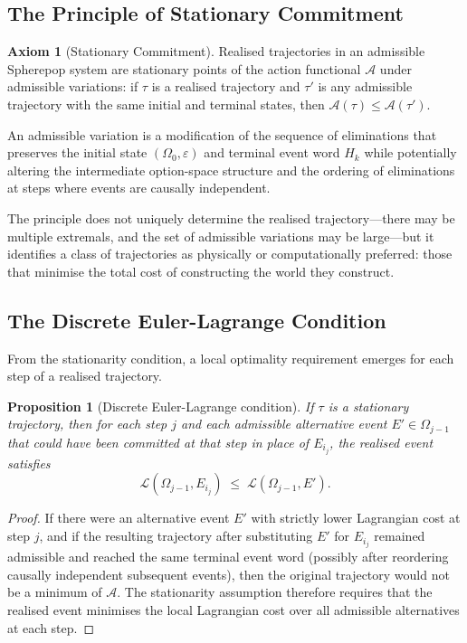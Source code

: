 \documentclass[12pt]{article}
\theoremstyle{plain}
\newtheorem{proposition}[theorem]{Proposition}
\theoremstyle{definition}
\newtheorem{axiom}[theorem]{Axiom}
\theoremstyle{remark}
\begin{document}
\subsection{The Principle of Stationary Commitment}

\begin{axiom}[Stationary Commitment]
\label{ax:stationary}
Realised trajectories in an admissible Spherepop system are stationary points
of the action functional $\mathcal{A}$ under admissible variations: if $\tau$
is a realised trajectory and $\tau'$ is any admissible trajectory with the same
initial and terminal states, then $\mathcal{A}(\tau) \leq \mathcal{A}(\tau')$.
\end{axiom}

An admissible variation is a modification of the sequence of eliminations that
preserves the initial state $(\Omega_0, \varepsilon)$ and terminal event word
$H_k$ while potentially altering the intermediate option-space structure and
the ordering of eliminations at steps where events are causally independent.

The principle does not uniquely determine the realised trajectory---there may be
multiple extremals, and the set of admissible variations may be large---but it
identifies a class of trajectories as physically or computationally preferred:
those that minimise the total cost of constructing the world they construct.

\subsection{The Discrete Euler-Lagrange Condition}

From the stationarity condition, a local optimality requirement emerges for each
step of a realised trajectory.

\begin{proposition}[Discrete Euler-Lagrange condition]
\label{prop:euler-lagrange}
If $\tau$ is a stationary trajectory, then for each step $j$ and each
admissible alternative event $E' \in \Omega_{j-1}$ that could have been
committed at that step in place of $E_{i_j}$, the realised event satisfies
\[
  \mathcal{L}(\Omega_{j-1}, E_{i_j}) \;\leq\; \mathcal{L}(\Omega_{j-1}, E').
\]
\end{proposition}

\begin{proof}
If there were an alternative event $E'$ with strictly lower Lagrangian cost at
step $j$, and if the resulting trajectory after substituting $E'$ for $E_{i_j}$
remained admissible and reached the same terminal event word (possibly after
reordering causally independent subsequent events), then the original trajectory
would not be a minimum of $\mathcal{A}$.  The stationarity assumption therefore
requires that the realised event minimises the local Lagrangian cost over all
admissible alternatives at each step.
\end{proof}
\end{document}
